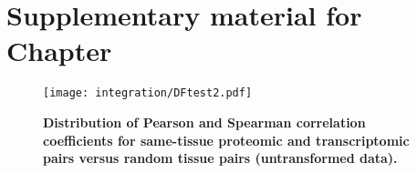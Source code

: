 \chapter{Suppl\texorpdfstring{ementary}{.} material for Chap\texorpdfstring{ter}{.}
}\label{ch:SupplIntegration}

\begin{figure}[!htpb]
    \texttt{[image: integration/DFtest2.pdf]}\centering
    \vspace{-3.5mm}
    \caption[Distribution of Pearson and Spearman correlation coefficients
    for same-tissue proteomic and transcriptomic pairs
    versus random tissue pairs (untransformed data)]{\label{fig:TestSigUnlog}%
    \textbf{Distribution of Pearson and Spearman correlation coefficients
    for same-tissue proteomic and transcriptomic pairs versus random tissue
    pairs (untransformed data).}}
\end{figure}


\pagestyle{plain}
\small

